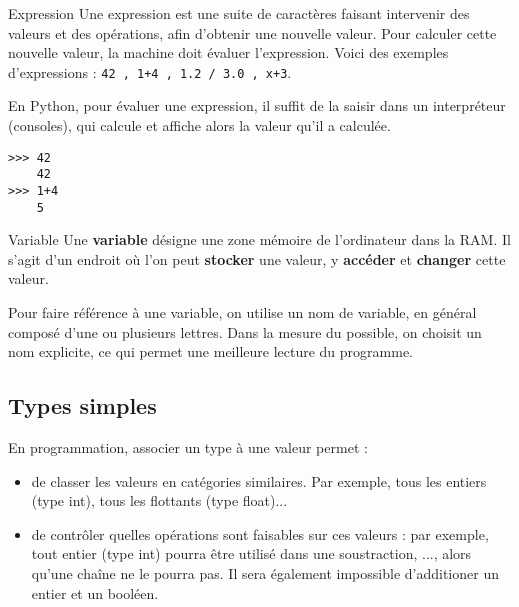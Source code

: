 \begin{defi}{Expression }
Une expression est une suite de caractères faisant intervenir des valeurs et des 
opérations, afin d'obtenir une nouvelle valeur. Pour calculer cette nouvelle valeur,
la machine doit {évaluer} l'expression. Voici des exemples d'expressions : \texttt{42 , 1+4 , 
1.2 / 3.0 , x+3}.

\end{defi}


En Python, pour évaluer une expression, il suffit de la saisir dans un interpréteur (consoles), qui
calcule et affiche alors la valeur qu'il a calculée.
\begin{lstlisting}
>>> 42
	42
>>> 1+4
	5
\end{lstlisting}



\begin{defi}{Variable}
Une \textbf{variable} désigne une zone mémoire de l'ordinateur dans la RAM.
Il s'agit d'un endroit où l'on peut \textbf{stocker} une valeur, y \textbf{accéder} et 
\textbf{changer} cette valeur.

Pour faire référence à une variable, on utilise un nom de variable, en général composé d'une ou 
plusieurs lettres. Dans la mesure du possible, on choisit un nom explicite, ce qui permet une 
meilleure lecture du programme.
\end{defi}





\subsection{Types simples}

En programmation, associer un type à une valeur permet :
\begin{itemize}
\item de classer les valeurs en catégories similaires. Par exemple, tous les
entiers (type int), tous les flottants (type float)...
\item de contrôler quelles opérations sont faisables sur ces valeurs : par
exemple, tout entier (type int) pourra être utilisé dans une soustraction, ..., alors 
qu'une chaîne ne le pourra pas. Il sera également impossible d'additioner un entier et un booléen. 
                                     
\end{itemize}

